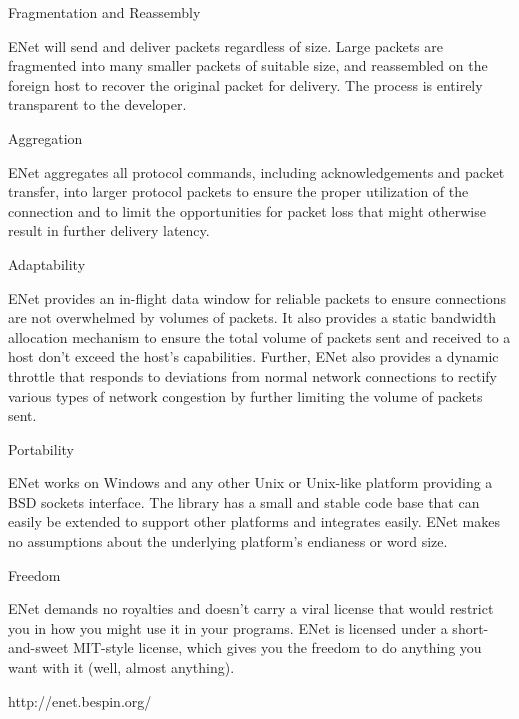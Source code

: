 Fragmentation and Reassembly

ENet will send and deliver packets regardless of size. Large packets are fragmented into many smaller packets of suitable size, and reassembled on the foreign host to recover the original packet for delivery. The process is entirely transparent to the developer.

Aggregation

ENet aggregates all protocol commands, including acknowledgements and packet transfer, into larger protocol packets to ensure the proper utilization of the connection and to limit the opportunities for packet loss that might otherwise result in further delivery latency.

Adaptability

ENet provides an in-flight data window for reliable packets to ensure connections are not overwhelmed by volumes of packets. It also provides a static bandwidth allocation mechanism to ensure the total volume of packets sent and received to a host don't exceed the host's capabilities. Further, ENet also provides a dynamic throttle that responds to deviations from normal network connections to rectify various types of network congestion by further limiting the volume of packets sent.

Portability

ENet works on Windows and any other Unix or Unix-like platform providing a BSD sockets interface. The library has a small and stable code base that can easily be extended to support other platforms and integrates easily. ENet makes no assumptions about the underlying platform's endianess or word size.

Freedom

ENet demands no royalties and doesn't carry a viral license that would restrict you in how you might use it in your programs. ENet is licensed under a short-and-sweet MIT-style license, which gives you the freedom to do anything you want with it (well, almost anything).

http://enet.bespin.org/

